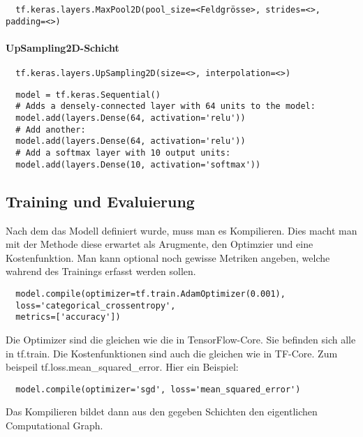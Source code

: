 \begin{verbatim}
  tf.keras.layers.MaxPool2D(pool_size=<Feldgrösse>, strides=<>, padding=<>)
\end{verbatim}


\paragraph{UpSampling2D-Schicht}

\begin{verbatim}
  tf.keras.layers.UpSampling2D(size=<>, interpolation=<>)
\end{verbatim}


\begin{verbatim}
  model = tf.keras.Sequential()
  # Adds a densely-connected layer with 64 units to the model:
  model.add(layers.Dense(64, activation='relu'))
  # Add another:
  model.add(layers.Dense(64, activation='relu'))
  # Add a softmax layer with 10 output units:
  model.add(layers.Dense(10, activation='softmax'))
\end{verbatim}


\subsection{Training und Evaluierung}

Nach dem das Modell definiert wurde, muss man es Kompilieren.
Dies macht man mit der Methode  diese erwartet als
Arugmente, den Optimzier und eine Kostenfunktion. Man kann optional noch gewisse
Metriken angeben, welche wahrend des Trainings erfasst werden sollen.
\begin{verbatim}
  model.compile(optimizer=tf.train.AdamOptimizer(0.001),
  loss='categorical_crossentropy',
  metrics=['accuracy'])
\end{verbatim}
Die Optimizer sind die gleichen wie die in TensorFlow-Core. Sie befinden sich
alle in tf.train. Die Kostenfunktionen sind auch die gleichen wie in TF-Core.
Zum beispeil tf.loss.mean\_squared\_error.
\para{}
Hier ein Beispiel:
\begin{verbatim}
  model.compile(optimizer='sgd', loss='mean_squared_error')
\end{verbatim}
Das Kompilieren bildet dann aus den gegeben Schichten den eigentlichen
Computational Graph.

